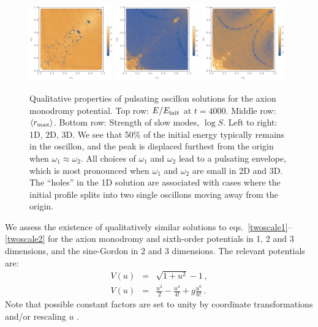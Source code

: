 \documentclass[%
reprint,
superscriptaddress,
amsmath,amssymb,
aps,
prl,
floatfix,
nofootinbib
]{revtex4-1}
\begin{document}
\begin{figure}
    \includegraphics[width=0.32\textwidth]{plot/slow-mode-logscale-axion-1d.png}
    \includegraphics[width=0.32\textwidth]{plot/slow-mode-logscale-axion-2d.png}
    \includegraphics[width=0.32\textwidth]{plot/slow-mode-logscale-axion-3d.png}
    \caption{Qualitative properties of pulsating oscillon solutions for the axion monodromy potential. Top row: $E/E_{\rm init}$ at $t=4000$.
      Middle row: $\langle r_{\rm max}\rangle$.
      Bottom row: Strength of slow modes, $\log{S}$.\quad
      Left to right: 1D, 2D, 3D. We see that 50\% of the initial energy typically remains in the oscillon, and the peak is displaced furthest from the origin when $\omega_1 \approx \omega_2$. All choices of  $\omega_1$ and $\omega_2$ lead to a pulsating envelope, which is most pronounced when $\omega_1$ and $\omega_2$ are small in 2D and 3D. The ``holes'' in the 1D solution are associated with cases where the initial profile splits into two single oscillons moving away from the origin.}\label{axion-monodromy}
\end{figure}


\medbreak{}   We  assess the existence of qualitatively similar solutions to eqs.~\ref{twoscale1}--\ref{twoscale2}  for the axion monodromy  and sixth-order potentials in 1, 2 and 3 dimensions, and the sine-Gordon in 2 and 3 dimensions. The relevant potentials are:
%
\begin{eqnarray}
  V(u) &=& \sqrt{1+u^2}-1 \label{axion-potential} \, ,\\
  V(u) &=& \frac{u^2}{2} - \frac{u^4}{4!} +g \frac{ u^6}{6!} \, .
\end{eqnarray}
%
Note that possible constant factors are set to unity by coordinate transformations and/or rescaling $u$ \cite{Amin:2010dc,Amin:2011hj}.
\end{document}
